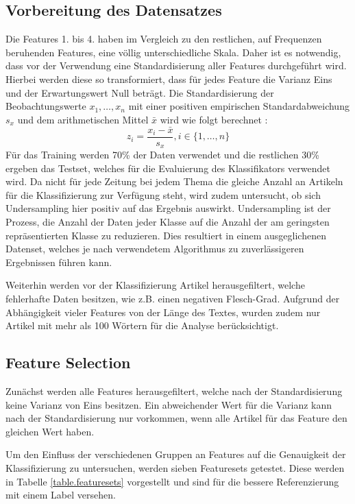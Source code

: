 \subsection{Vorbereitung des Datensatzes}
Die Features 1. bis 4. haben im Vergleich zu den restlichen, auf Frequenzen beruhenden Features, eine völlig unterschiedliche Skala. Daher ist es notwendig, dass vor der Verwendung eine Standardisierung aller Features durchgeführt wird. Hierbei werden diese so transformiert, dass für jedes Feature die Varianz Eins und der Erwartungswert Null beträgt. Die Standardisierung der Beobachtungswerte $x_1,\dots,x_n$ mit einer positiven empirischen Standardabweichung $s_x$ und dem arithmetischen Mittel $\bar{x}$ wird wie folgt berechnet \cite[S.~104]{burkschat2012beschreibende}:
\[ z_i = \frac{x_i-\bar{x}}{s_x}, i\in\{1,\dots,n\} \]
Für das Training werden 70\% der Daten verwendet und die restlichen 30\% ergeben das Testset, welches für die Evaluierung des Klassifikators verwendet wird. Da nicht für jede Zeitung bei jedem Thema die gleiche Anzahl an Artikeln für die Klassifizierung zur Verfügung steht, wird zudem untersucht, ob sich Undersampling hier positiv auf das Ergebnis auswirkt. Undersampling ist der Prozess, die Anzahl der Daten jeder Klasse auf die Anzahl der am geringsten repräsentierten Klasse zu reduzieren. Dies resultiert in einem ausgeglichenen Datenset, welches je nach verwendetem Algorithmus zu zuverlässigeren Ergebnissen führen kann.

Weiterhin werden vor der Klassifizierung Artikel herausgefiltert, welche fehlerhafte Daten besitzen, wie z.B. einen negativen Flesch-Grad. Aufgrund der Abhängigkeit vieler Features von der Länge des Textes, wurden zudem nur Artikel mit mehr als 100 Wörtern für die Analyse berücksichtigt.

\subsection{Feature Selection}\label{feature_selection}
Zunächst werden alle Features herausgefiltert, welche nach der Standardisierung keine Varianz von Eins besitzen. Ein abweichender Wert für die Varianz kann nach der Standardisierung nur vorkommen, wenn alle Artikel für das Feature den gleichen Wert haben.

Um den Einfluss der verschiedenen Gruppen an Features auf die Genauigkeit der Klassifizierung zu untersuchen, werden sieben Featuresets getestet. Diese werden in Tabelle \ref{table.featuresets} vorgestellt und sind für die bessere Referenzierung mit einem Label versehen.


